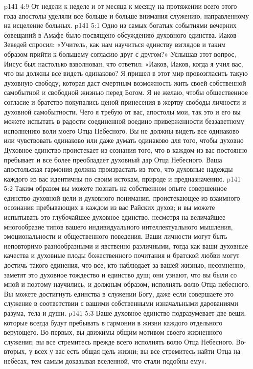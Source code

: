 \vs p141 4:9 От недели к неделе и от месяца к месяцу на протяжении всего этого года апостолы уделяли все больше и больше внимания служению, направленному на исцеление больных.
\vs p141 5:1 Одно из самых богатых событиями вечерних совещаний в Амафе было посвящено обсуждению духовного единства. Иаков Зеведей спросил: «Учитель, как нам научиться единству взглядов и таким образом прийти к большему согласию друг с другом?» Услышав этот вопрос, Иисус был настолько взволнован, что ответил: «Иаков, Иаков, когда я учил вас, что вы должны все видеть одинаково? Я пришел в этот мир провозгласить такую духовную свободу, которая даст смертным возможность жить своей собственной самобытной и свободной жизнью перед Богом. Я не желаю, чтобы общественное согласие и братство покупались ценой принесения в жертву свободы личности и духовной самобытности. Чего я требую от вас, апостолы мои, так это  и его вы можете испытать в радости соединенной воедино приверженности беззаветному исполнению воли моего Отца Небесного. Вы не должны видеть все одинаково или чувствовать одинаково или даже думать одинаково для того, чтобы духовно  Духовное единство проистекает из сознания того, что в каждом из вас постоянно пребывает и все более преобладает духовный дар Отца Небесного. Ваша апостольская гармония должна произрастать из того, что духовные надежды каждого из вас идентичны по своим истокам, природе и предназначению.
\vs p141 5:2 Таким образом вы можете познать на собственном опыте совершенное единство духовной цели и духовного понимания, проистекающее из взаимного осознания пребывающих в каждом из вас Райских духов; и вы можете испытывать это глубочайшее духовное единство, несмотря на величайшее многообразие типов вашего индивидуального интеллектуального мышления, эмоциональности и общественного поведения. Ваши личности могут быть неповторимо разнообразными и явственно различными, тогда как ваши духовные качества и духовные плоды божественного почитания и братской любви могут достичь такого единения, что все, кто наблюдает за вашей жизнью, несомненно, заметят это духовное тождество и единство душ; они узнают, что вы были со мной и поэтому научились, и должным образом, исполнять волю Отца небесного. Вы можете достигнуть единства в служении Богу, даже если совершаете это служение в соответствии с вашими собственными изначальными дарованиями разума, тела и души.
\vs p141 5:3 Ваше духовное единство подразумевает две вещи, которые всегда будут пребывать в гармонии в жизни каждого отдельного верующего. Во\hyp{}первых, вы движимы общим мотивом своего жизненного служения; вы все стремитесь прежде всего исполнять волю Отца Небесного. Во\hyp{}вторых, у всех у вас есть общая цель жизни; вы все стремитесь найти Отца на небесах, тем самым доказывая вселенной, что стали подобны ему».
